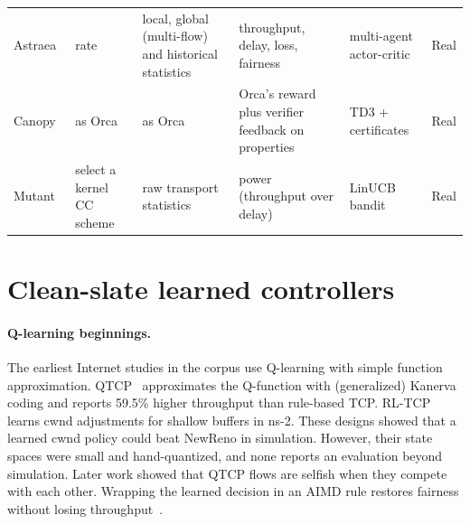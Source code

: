\begin{table}[t]
\begin{tabularx}{\linewidth}{@{}L{2.0cm}L{2.75cm}YL{2.55cm}L{1.75cm}l@{}}
Astraea~\cite{liao2024astraea} & rate & local, global (multi-flow) and historical statistics & throughput, delay, loss, fairness & multi-agent actor-critic & Real \\
Canopy~\cite{yang2024canopy} & as Orca & as Orca & Orca's reward plus verifier feedback on properties & TD3 + certificates & Real \\
Mutant~\cite{pappone2025mutant} & select a kernel CC scheme & raw transport statistics & power (throughput over delay) & LinUCB bandit & Real \\
\bottomrule
\end{tabularx}
\end{table}

\section{Clean-slate learned controllers}
\label{sec:clean-slate}

\paragraph{Q-learning beginnings.} The earliest Internet studies in the corpus use Q-learning with simple function approximation. QTCP~\cite{li2019qtcp,li2017dynamic} approximates the Q-function with (generalized) Kanerva coding and reports 59.5\% higher throughput than rule-based TCP. RL-TCP~\cite{kong2018improving} learns cwnd adjustments for shallow buffers in ns-2. These designs showed that a learned cwnd policy could beat NewReno in simulation. However, their state spaces were small and hand-quantized, and none reports an evaluation beyond simulation. Later work showed that QTCP flows are selfish when they compete with each other. Wrapping the learned decision in an AIMD rule restores fairness without losing throughput~\cite{yamazaki2021fairness}.

